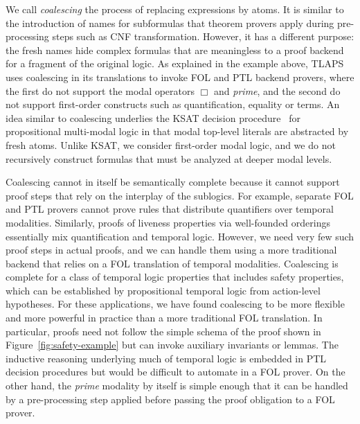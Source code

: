 \documentclass{easychair}
\newcommand{\tlaplus}{\mbox{TLA\kern -.35ex$^+$}\xspace}
\newcommand{\edmargin}[2]{\marginpar{\raggedright\footnotesize\color{red}#1: #2}}
\newcommand{\edmargin}[2]{}
\def\smmargin{\edmargin{SM}}
\def\ddmargin{\edmargin{DD}}
\begin{document}
We call \emph{coalescing} the process of replacing expressions by atoms. It is
similar to the introduction of names for subformulas that theorem provers apply
during pre-processing steps such as CNF transformation. However, it has a
different purpose: the fresh names hide complex formulas that are meaningless to
a proof backend for a fragment of the original logic.
As explained in the example above, TLAPS uses coalescing in its translations to
invoke FOL and PTL backend provers, where the first do not support the modal
operators $\Box$ and \emph{prime}, and the second
do not support first-order constructs such as
quantification, equality or terms.
  \smmargin{Jul 3: added reference to KSAT}
%
An idea similar to coalescing underlies the KSAT decision
procedure~\cite{giunchiglia:ksat} for propositional multi-modal logic in that
modal top-level literals are abstracted by fresh atoms. Unlike KSAT, we consider
first-order modal logic, and we do not recursively construct formulas that must
be analyzed at deeper modal levels.

Coalescing cannot in itself be semantically complete because it cannot support
proof steps that rely on the interplay of the sublogics. For example,
separate FOL and PTL provers
cannot
prove rules that distribute quantifiers over temporal modalities. Similarly,
proofs of liveness properties via well-founded orderings essentially mix
quantification and temporal logic. However, we need very few such proof steps
in actual
proofs, and we can handle them using a more traditional
backend that relies on a FOL translation of temporal modalities. Coalescing is
complete for a class of temporal logic properties that includes safety
properties, which can be established by propositional temporal logic from
action-level hypotheses. For these applications, we have found coalescing to
be more flexible and more powerful in practice than a more traditional FOL
translation. In particular, proofs need not follow the simple schema of the
proof shown in Figure~\ref{fig:safety-example} but can invoke auxiliary
invariants or lemmas. The inductive reasoning underlying much of temporal logic
is embedded in PTL decision procedures but would be difficult to automate in a
FOL prover. On the other hand, the \emph{prime} modality by itself is simple
enough that it can be handled by a pre-processing step applied before passing
the proof obligation to a FOL prover.

\end{document}
